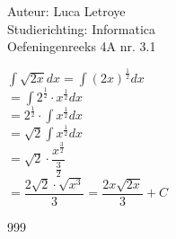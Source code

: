 \documentclass[a4paper]{article}
\begin{document}
  
\noindent \large Auteur: Luca Letroye \\
\noindent \large Studierichting: Informatica\\
\noindent \large Oefeningenreeks 4A nr. 3.1\\

\medskip


\normalsize

$\displaystyle\int \sqrt{2x}dx = \displaystyle\int (2x)^{\tfrac{1}{2}} dx$\\

$ = \displaystyle\int 2^{\tfrac{1}{2}} \cdot x^{\tfrac{1}{2}} dx$\\

$= 2^{\tfrac{1}{2}} \cdot  \displaystyle\int x^{\tfrac{1}{2}} dx$\\

$ = \sqrt{2} \displaystyle\int x^{\tfrac{1}{2}}dx$\\

$ = \sqrt{2} \cdot  \dfrac{x^{\tfrac{3}{2}}}{\tfrac{3}{2}}$\\

$ = \dfrac{2\sqrt{2}\cdot \sqrt{x^3}}{3} = \dfrac{2x\sqrt{2x}}{3} +C$

\begin{thebibliography}{999}
\end{thebibliography}
\end{document}
